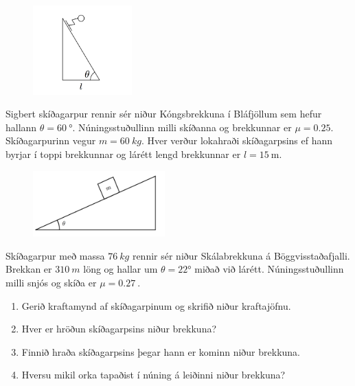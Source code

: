 \ifdefined \wholebook \else\documentclass[oneside]{book}\usepackage{EdlBook}\graphicspath{{figures/}}
\begin{document}
\begin{enumerate}[label = \textbf{Dæmi \thechapter.\arabic*.}]
\begin{minipage}{\linewidth}
\begin{figure}
\vspace{-2cm}
\includegraphics[width=1.5in]{images/skidi.png}
\end{figure}

\vspace{-0.5cm}

\item Sigbert skíðagarpur rennir sér niður Kóngsbrekkuna í Bláfjöllum sem hefur hallann $\theta = \SI{60}{\degree}$. Núningsstuðullinn milli skíðanna og brekkunnar er $\mu = 0.25$. Skíðagarpurinn vegur $m = \SI{60}{kg}$. Hver verður lokahraði skíðagarpsins ef hann byrjar í toppi brekkunnar og lárétt lengd brekkunnar er $l = \SI{15}{\metre}$.
\end{minipage}

\vspace{0.3cm}

\begin{minipage}{\linewidth}
\begin{figure}
\includegraphics[width=2in]{images/skabjol.png}
\end{figure}

\item Skíðagarpur með massa $\SI{76}{kg}$ rennir sér niður Skálabrekkuna á Böggvisstaðafjalli. Brekkan er $\SI{310}{m}$ löng og hallar um  $\theta = \ang{22}$ miðað við lárétt. Núningsstuðullinn milli snjós og skíða er $\mu = \SI{0.27}{}$. 
\end{minipage}
\vspace{0.1cm}
\begin{enumerate}[label = \textbf{(\alph*)}]
    \item Gerið kraftamynd af skíðagarpinum og skrifið niður kraftajöfnu.
    \item Hver er hröðun skíðagarpsins niður brekkuna?
    \item Finnið hraða skíðagarpsins þegar hann er kominn niður brekkuna.
    \item Hversu mikil orka tapaðist í núning á leiðinni niður brekkuna?
\end{enumerate}


\end{enumerate}
\end{document}
